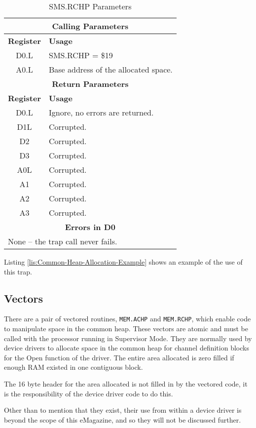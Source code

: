 \begin{table}[!h]
\begin{centering}
\begin{tabular}{|c|>{\raggedright}p{}|}
\hline 
\multicolumn{2}{|c|}{\textbf{Calling Parameters}}\tabularnewline
\hline 
\textbf{Register} & \textbf{Usage}\tabularnewline
\hline 
D0.L & SMS.RCHP = \$19\tabularnewline
\hline 
A0.L & Base address of the allocated space.\tabularnewline
\hline 
\multicolumn{2}{|c|}{\textbf{Return Parameters}}\tabularnewline
\hline 
\textbf{Register} & \textbf{Usage}\tabularnewline
\hline 
D0.L & Ignore, no errors are returned.\tabularnewline
\hline 
D1L & Corrupted.\tabularnewline
\hline 
D2 & Corrupted.\tabularnewline
\hline 
D3 & Corrupted.\tabularnewline
\hline 
A0L & Corrupted.\tabularnewline
\hline 
A1 & Corrupted.\tabularnewline
\hline 
A2 & Corrupted.\tabularnewline
\hline 
A3 & Corrupted.\tabularnewline
\hline 
\multicolumn{2}{|c|}{\textbf{Errors in D0}}\tabularnewline
\hline 
\multicolumn{2}{|l|}{None -- the trap call never fails.}\tabularnewline
\hline 
\end{tabular}
\par\end{centering}
\caption{SMS.RCHP Parameters\label{tab:SMS.RCHP-Parameters}}
\end{table}

Listing \ref{lis:Common-Heap-Allocation-Example} shows an example
of the use of this trap.

\subsection{Vectors}

There are a pair of vectored routines, \texttt{MEM.ACHP} and \texttt{MEM.RCHP},
which enable code to manipulate space in the common heap. These vectors
are atomic and must be called with the processor running in Supervisor
Mode. They are normally used by device drivers to allocate space in
the common heap for channel definition blocks for the Open function
of the driver. The entire area allocated is zero filled if enough
RAM existed in one contiguous block.

The 16 byte header for the area allocated is not filled in by the
vectored code, it is the responsibility of the device driver code
to do this. 

Other than to mention that they exist, their use from within a device
driver is beyond the scope of this eMagazine, and so they will not
be discussed further.

